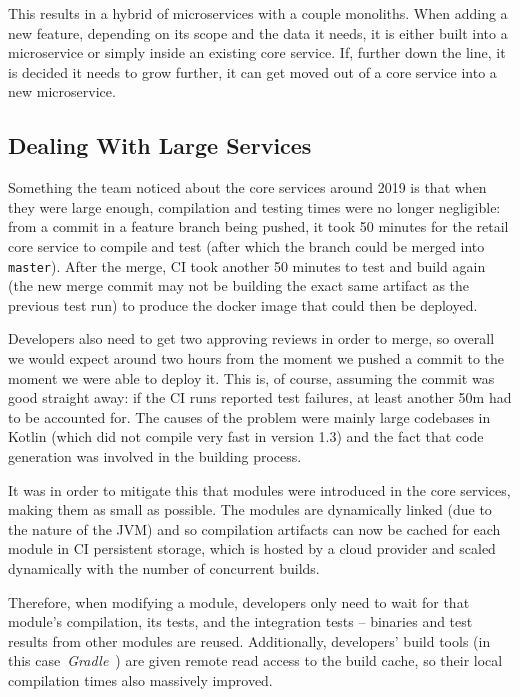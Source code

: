 \documentclass[conference]{IEEEtran}
\begin{document}
    This results in a hybrid of microservices with a couple monoliths.
    When adding a new feature, depending on its scope and the data it needs, it is either built into
    a microservice or simply inside an existing core service.
    If, further down the line, it is decided it needs to grow further, it can get moved out of a
    core service into a new microservice.

    \subsection{Dealing With Large Services}

    Something the team noticed about the core services around 2019 is that when they were large
    enough, compilation and testing times were no longer negligible: from a commit in a feature
    branch being pushed, it took 50 minutes for the retail core service to compile and test
    (after which the branch could be merged into \texttt{master}).
    After the merge, CI took another 50 minutes to test and build again (the new merge commit
    may not be building the exact same artifact as the previous test run) to produce
    the docker image that could then be deployed.

    Developers also need to get two approving reviews in order to merge, so overall we would
    expect around two hours from the moment we pushed a commit to the moment we were able to deploy it.
    This is, of course, assuming the commit was good straight away: if the CI runs reported
    test failures, at least another 50m had to be accounted for.
    The causes of the problem were mainly large codebases in Kotlin (which did not compile very fast in version 1.3)
    and the fact that code generation was involved in the building process.

    It was in order to mitigate this that modules were introduced in the core services, making them
    as small as possible.
    The modules are dynamically linked (due to the nature of the JVM) and so compilation artifacts
    can now be cached for each module in CI persistent storage, which is hosted by a cloud provider
    and scaled dynamically with the number of concurrent builds.

    Therefore, when modifying a module, developers only need to wait for that module's compilation,
    its tests, and the integration tests -- binaries and test results from other modules are reused.
    Additionally, developers' build tools (in this case~\emph{Gradle}~\cite{gradle.org}) are given remote read
    access to the build cache, so their local compilation times also massively improved.
\end{document}
